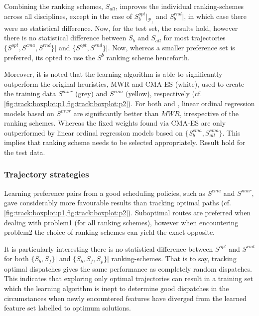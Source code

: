 Combining the ranking schemes, $S_{all}$, improves the individual ranking-schemes across all disciplines, except in the case of $S_b^{opt}\big|_{\mathcal{P_1}}$ and $S_b^{rnd}\big|$\!, in which case there were no statistical difference. Now, for the test set, the results hold, however there is no statistical difference between $S_b$ and $S_{all}$ for most trajectories $\{S^{opt},S^{cma},S^{rnd}\}\big|$\! and  $\{S^{opt},S^{rnd}\}\big|$\!. Now, whereas a smaller preference set is preferred, its opted to use the $S^{b}$ ranking scheme henceforth. 

Moreover, it is noted that the learning algorithm is able to significantly outperform the original heuristics, MWR and CMA-ES (white), used to create the training data $S^{mwr}$ (grey) and $S^{cma}$ (yellow), respectively (cf. \cref{fig:track:boxplot:p1,fig:track:boxplot:p2}). For both  and , linear ordinal regression models based on $S^{mwr}$ are significantly better than $MWR$, irrespective of the ranking schemes. Whereas the fixed weights found via CMA-ES are only outperformed by linear ordinal regression models based on $\{S_b^{cma},S_{all}^{cma}\}$. This implies that ranking scheme needs to be selected appropriately. Result hold for the test data.

\subsubsection{Trajectory strategies}
Learning preference pairs from a good scheduling policies, such as $S^{cma}$ and $S^{mwr}$, gave considerably more favourable results than tracking optimal paths (cf. \cref{fig:track:boxplot:p1,fig:track:boxplot:p2}). Suboptimal routes are preferred when dealing with problem{1} (for all ranking schemes), however when encountering problem{2} the choice of ranking schemes can yield the exact opposite.

It is particularly interesting there is no statistical difference between $S^{opt}$ and $S^{rnd}$ for both $\{S_{b},S_{f}\}\big|$ and $\{S_b,S_f,S_p\}\big|$ ranking-schemes. That is to say, tracking optimal dispatches gives the same performance as completely random dispatches. This indicates that exploring only optimal trajectories can result in a training set which the learning algorithm is inept to determine good dispatches in the circumstances when newly encountered features have diverged from the learned feature set labelled to optimum solutions. 

